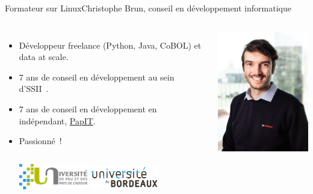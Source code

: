 \documentclass{beamer}
\begin{document}
    \begin{frame}{Formateur sur Linux}{Christophe Brun, conseil en développement informatique}

        \begin{columns}
            \begin{itemize}
                \item Développeur freelance (Python, Java, CoBOL) et data at scale.

                \item 7 ans de conseil en développement au sein d'SSII~.

                \item 7 ans de conseil en développement en indépendant, \href{https://papit.fr}{PapIT}.

                \item Passionné~!
                \bigbreak
                \begin{columns}
                    \centering
                    \includegraphics[width=3cm]{image/logo-uppa}
                    \centering
                    \includegraphics[width=3cm]{image/logo-universite-bordeaux}
                \end{columns}
            \end{itemize}
            \centering
            \includegraphics[width=5cm]{image/trombine-christophe}
        \end{columns}
    \end{frame}
\end{document}
